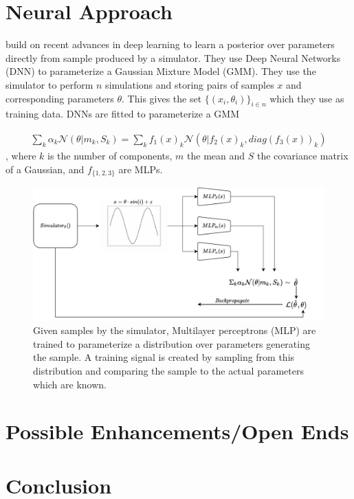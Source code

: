 \documentclass[12pt]{article}
\begin{document}
 



\section*{Neural Approach}
\citet{papamakarios2016fast} build on recent advances in deep learning to learn a posterior over parameters directly from sample produced by a simulator. They use Deep Neural Networks (DNN) to parameterize a Gaussian Mixture Model (GMM). They use the simulator to perform $n$ simulations and storing pairs of samples $x$ and corresponding parameters $\theta$. This gives the set $\lbrace(x_i,\theta_i)\rbrace_{i \in n}$ which they use as training data. DNNs are fitted to parameterize a GMM

\begin{align}
	\sum_k \alpha_k \mathcal{N}(\theta|m_k, S_k) = \sum_k f_1(x)_k \mathcal{N}(\theta|f_2(x)_k, diag(f_3(x))_k)
\end{align}
, where $k$ is the number of components, $m$ the mean and $S$ the covariance matrix of a Gaussian, and $f_{\lbrace 1,2,3 \rbrace}$ are MLPs.


\begin{figure}
	\centering
	\includegraphics[width=.8\linewidth]{figures/sbi_vis.pdf}
	\caption{Given samples by the simulator, Multilayer perceptrons (MLP) are trained to parameterize a distribution over parameters generating the sample. A training signal is created by sampling from this distribution and comparing the sample to the actual parameters which are known.}
\end{figure} 

\section*{Possible Enhancements/Open Ends}
\section*{Conclusion}
\end{document}
